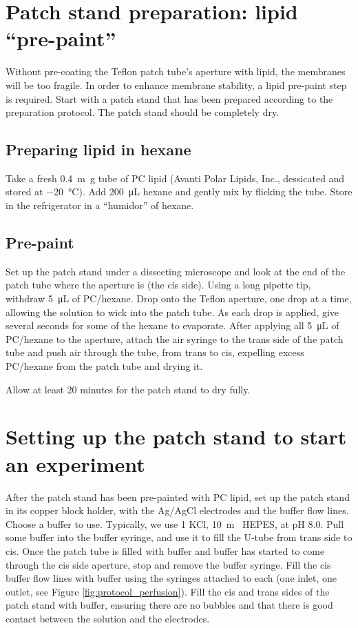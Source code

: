 \section{Patch stand preparation: lipid ``pre-paint”}

Without pre-coating the Teflon patch tube's aperture with lipid, the membranes will be too fragile.  In order to enhance membrane stability, a lipid pre-paint step is required.  Start with a patch stand that has been prepared according to the preparation protocol.  The patch stand should be completely dry.

\subsection{Preparing lipid in hexane}

Take a fresh \SI{0.4}{\m\g} tube of PC lipid (Avanti Polar Lipids, Inc., dessicated and stored at \SI{-20}{\celsius}).  Add \SI{200}{\micro\L} hexane and gently mix by flicking the tube.  Store in the refrigerator in a ``humidor” of hexane.

\subsection{Pre-paint}

Set up the patch stand under a dissecting microscope and look at the end of the patch tube where the aperture is (the cis side).  Using a long pipette tip, withdraw \SI{5}{\micro\L} of PC/hexane.  Drop onto the Teflon aperture, one drop at a time, allowing the solution to wick into the patch tube.  As each drop is applied, give several seconds for some of the hexane to evaporate.  After applying all \SI{5}{\micro\L} of PC/hexane to the aperture, attach the air syringe to the trans side of the patch tube and push air through the tube, from trans to cis, expelling excess PC/hexane from the patch tube and drying it.

Allow at least \num{20} minutes for the patch stand to dry fully.

\section{Setting up the patch stand to start an experiment}

After the patch stand has been pre-painted with PC lipid, set up the patch stand in its copper block holder, with the Ag/AgCl electrodes and the buffer flow lines.  Choose a buffer to use.  Typically, we use \SI{1}{\Molar} KCl, \SI{10}{\m\Molar} HEPES, at pH \num{8.0}.  Pull some buffer into the buffer syringe, and use it to fill the U-tube from trans side to cis.  Once the patch tube is filled with buffer and buffer has started to come through the cis side aperture, stop and remove the buffer syringe.  Fill the cis buffer flow lines with buffer using the syringes attached to each (one inlet, one outlet, see Figure \ref{fig:protocol_perfusion}).  Fill the cis and trans sides of the patch stand with buffer, ensuring there are no bubbles and that there is good contact between the solution and the electrodes.

